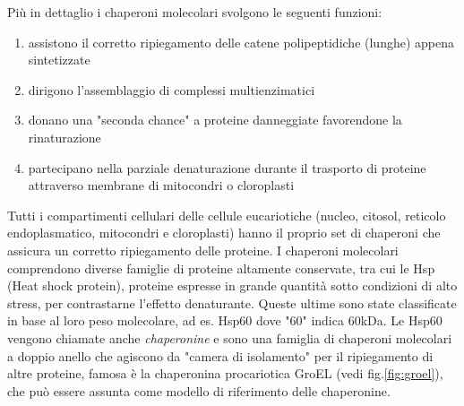 Più in dettaglio i chaperoni molecolari svolgono le seguenti funzioni:
\begin{enumerate}
	\item assistono il corretto ripiegamento delle catene polipeptidiche (lunghe) appena sintetizzate
	\item dirigono l'assemblaggio di complessi multienzimatici
	\item donano una "seconda chance" a proteine danneggiate favorendone la rinaturazione
	\item partecipano nella parziale denaturazione durante il trasporto di proteine attraverso membrane di mitocondri o cloroplasti
\end{enumerate}

Tutti i compartimenti cellulari delle cellule eucariotiche (nucleo, citosol, reticolo endoplasmatico, mitocondri e cloroplasti) hanno il proprio set di chaperoni che assicura un corretto ripiegamento delle proteine. I chaperoni molecolari comprendono diverse famiglie di proteine altamente conservate, tra cui le Hsp (Heat shock protein), proteine espresse in grande quantità sotto condizioni di alto stress, per contrastarne l'effetto denaturante. Queste ultime sono state classificate in base al loro peso molecolare, ad es. Hsp60 dove "60" indica 60kDa. Le Hsp60 vengono chiamate anche \textit{chaperonine} e sono una famiglia di chaperoni molecolari a doppio anello che agiscono da "camera di isolamento" per il ripiegamento di altre proteine\supercite{ranson1998chaperonins}, famosa è la chaperonina procariotica GroEL (vedi fig.\ref{fig:groel}), che può essere assunta come modello di riferimento delle chaperonine. 

\begin{figure}[h]
	
\end{figure}

